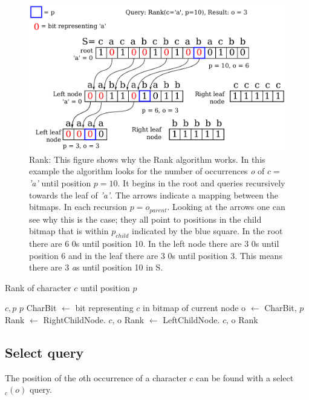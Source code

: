 \begin{figure}
\center \includegraphics[width=1\textwidth]{RankDrawing}
\caption{Rank: This figure shows why the Rank algorithm works. 
In this example the algorithm looks for the number of occurrences \textit{o} of $c = $ \textit{'a'} until position $p = 10$.
It begins in the root and queries recursively towards the leaf of \textit{'a'}.
The arrows indicate a mapping between the bitmaps.
In each recursion $p = o_{parent}$.
Looking at the arrows one can see why this is the case; they all point to positions in the child bitmap that is within $p_{child}$ indicated by the blue square.
In the root there are 6 0s until position 10. 
In the left node there are 3 0s until position 6
and in the leaf there are 3 0s until position 3. This means there are 3 \textit{a}s until position 10 in S.}
\label{fig:RankDrawing}
\end{figure}

\begin{algorithm}
\caption{Rank of character $c$ until position $p$}
\label{alg:rank}
\begin{algorithmic} 
 {$c, p$}
\State \Return $p$
\EndIf
\State CharBit $\gets$ bit representing $c$ in bitmap of current node
\State o $\gets$  {CharBit, $p$}
	\State Rank $\gets$ RightChildNode. {$c$, o}
\Else
	\State Rank $\gets$ LeftChildNode. {$c$, o}
\EndIf
\State \Return Rank
\EndFunction
\end{algorithmic}
\end{algorithm}


\subsection{Select query}
\label{sec:selectDescription}
The position of the $o$th occurrence of a character $c$ can be found with a select$_c(o)$ query.


